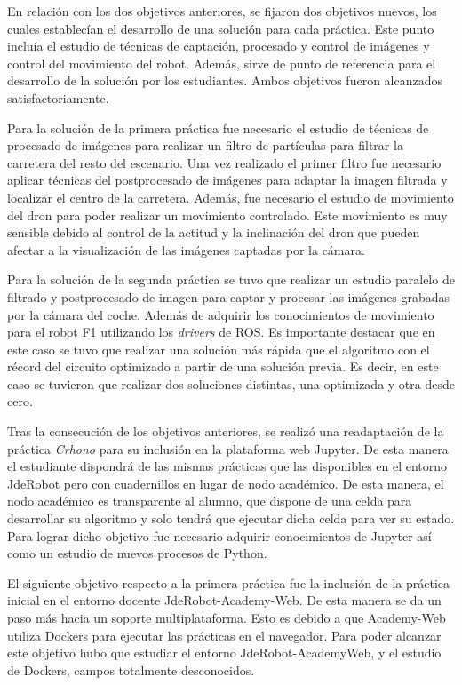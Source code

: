 En relación con los dos objetivos anteriores, se fijaron dos objetivos nuevos, los cuales establecían el desarrollo de una solución para cada práctica. Este punto incluía el estudio de técnicas de captación, procesado y control de imágenes y control del movimiento del robot. Además, sirve de punto de referencia para el desarrollo de la solución por los estudiantes. Ambos objetivos fueron alcanzados satisfactoriamente.

Para la solución de la primera práctica fue necesario el estudio de técnicas de procesado de imágenes para realizar un filtro de partículas para filtrar la carretera del resto del escenario. Una vez realizado el primer filtro fue necesario aplicar técnicas del postprocesado de imágenes para adaptar la imagen filtrada y localizar el centro de la carretera. Además, fue necesario el estudio de movimiento del dron para poder realizar un movimiento controlado. Este movimiento es muy sensible debido al control de la actitud y la inclinación del dron que pueden afectar a la visualización de las imágenes captadas por la cámara.

Para la solución de la segunda práctica se tuvo que realizar un estudio paralelo de filtrado y postprocesado de imagen para captar y procesar las imágenes grabadas por la cámara del coche. Además de adquirir los conocimientos de movimiento para el robot F1 utilizando los \textit{drivers} de ROS. Es importante destacar que en este caso se tuvo que realizar una solución más rápida que el algoritmo con el récord del circuito optimizado a partir de una solución previa. Es decir, en este caso se tuvieron que realizar dos soluciones distintas, una optimizada y otra desde cero.

Tras la consecución de los objetivos anteriores, se realizó una readaptación de la práctica \textit{Crhono} para su inclusión en la plataforma web Jupyter. De esta manera el estudiante dispondrá de las mismas prácticas que las disponibles en el entorno JdeRobot pero con cuadernillos en lugar de nodo académico. De esta manera, el nodo académico es transparente al alumno, que dispone de una celda para desarrollar su algoritmo y solo tendrá que ejecutar dicha celda para ver su estado.
Para lograr dicho objetivo fue necesario adquirir conocimientos de Jupyter así como un estudio de nuevos procesos de Python.

El siguiente objetivo respecto a la primera práctica fue la inclusión de la práctica inicial en el entorno docente JdeRobot-Academy-Web. De esta manera se da un paso más hacia un soporte multiplataforma. Esto es debido a que Academy-Web utiliza Dockers para ejecutar las prácticas en el navegador. Para poder alcanzar este objetivo hubo que estudiar el entorno JdeRobot-AcademyWeb, y el estudio de Dockers, campos totalmente desconocidos.

